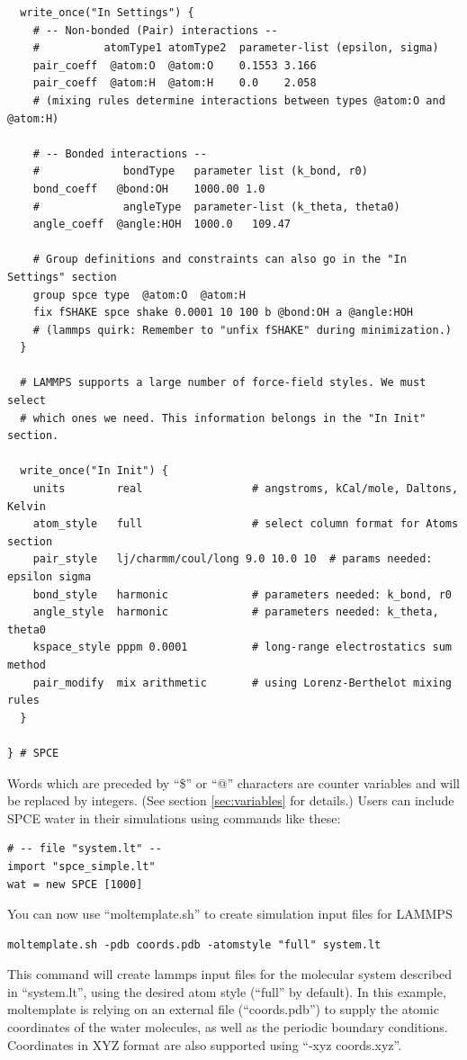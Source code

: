 \documentclass[11pt]{article}
\begin{document}
\begin{verbatim}
  write_once("In Settings") {
    # -- Non-bonded (Pair) interactions --
    #          atomType1 atomType2  parameter-list (epsilon, sigma)
    pair_coeff  @atom:O  @atom:O    0.1553 3.166 
    pair_coeff  @atom:H  @atom:H    0.0    2.058
    # (mixing rules determine interactions between types @atom:O and @atom:H)

    # -- Bonded interactions --
    #             bondType   parameter list (k_bond, r0)
    bond_coeff   @bond:OH    1000.00 1.0 
    #             angleType  parameter-list (k_theta, theta0)
    angle_coeff  @angle:HOH  1000.0   109.47

    # Group definitions and constraints can also go in the "In Settings" section
    group spce type  @atom:O  @atom:H
    fix fSHAKE spce shake 0.0001 10 100 b @bond:OH a @angle:HOH
    # (lammps quirk: Remember to "unfix fSHAKE" during minimization.)
  }

  # LAMMPS supports a large number of force-field styles. We must select
  # which ones we need. This information belongs in the "In Init" section.

  write_once("In Init") {
    units        real                 # angstroms, kCal/mole, Daltons, Kelvin
    atom_style   full                 # select column format for Atoms section
    pair_style   lj/charmm/coul/long 9.0 10.0 10  # params needed: epsilon sigma
    bond_style   harmonic             # parameters needed: k_bond, r0
    angle_style  harmonic             # parameters needed: k_theta, theta0
    kspace_style pppm 0.0001          # long-range electrostatics sum method
    pair_modify  mix arithmetic       # using Lorenz-Berthelot mixing rules
  }

} # SPCE
\end{verbatim}
Words which are preceded by ``\$'' or ``@'' characters 
are counter variables and will be replaced by integers. 
(See section \ref{sec:variables} for details.)
Users can include SPCE water in their simulations using commands like these:
\begin{verbatim}
# -- file "system.lt" --
import "spce_simple.lt"
wat = new SPCE [1000]
\end{verbatim}
You can now use ``moltemplate.sh'' to create simulation input files for LAMMPS
\begin{verbatim}
moltemplate.sh -pdb coords.pdb -atomstyle "full" system.lt
\end{verbatim}
This command will create lammps input files 
for the molecular system described in ``system.lt'',
using the desired atom style (``full'' by default).
In this example, moltemplate is relying on an external file (``coords.pdb'')
to supply the atomic coordinates of the water molecules, as well as
the periodic boundary conditions.
Coordinates in XYZ format are also supported using ``-xyz coords.xyz''. 
\end{document}
